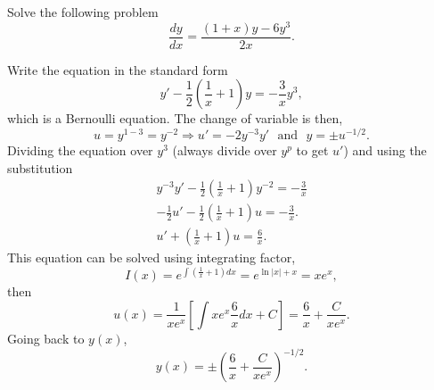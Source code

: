 \documentclass[11pt]{article}
\begin{document}
\begin{problem}
Solve the following problem
\begin{equation*}
     \frac{dy}{dx}=\frac{(1+x)y-6y^{3}}{2x}.
\end{equation*}
\end{problem}
\begin{solution}
Write the equation in the standard form
\[y'-\frac{1}{2}\left(\frac{1}{x}+1\right)y=-\frac{3}{x}y^{3},\]
which is a Bernoulli equation. The change of variable is then,
\[u = y^{1-3}=y^{-2}\Rightarrow u'=-2 y^{-3}y' \,\,\text{ and }\,\, y = \pm u^{-1/2}.\]
Dividing the equation over $y^{3}$ (always divide over $y^{p}$ to get $u'$) and using the substitution
\begin{gather*}
y^{-3}y'-\frac{1}{2}\left(\frac{1}{x}+1\right)y^{-2}=-\frac{3}{x} \\
-\frac{1}{2}u' - \frac{1}{2} \left(\frac{1}{x}+1\right)u=-\frac{3}{x}. \\
u' + \left(\frac{1}{x}+1\right)u=\frac{6}{x}.
\end{gather*}
This equation can be solved using integrating factor,
\[I(x)=e^{\int\left(\frac{1}{x}+1\right)dx}=e^{\ln|x|+x}=xe^{x},\]
then
\[u(x)= \frac{1}{x e^{x}}\left[\int xe^{x}\frac{6}{x}dx + C\right]= \frac{6}{x}+\frac{C}{xe^{x}}.\]
Going back to $y(x)$,
\[\boxed{y(x)= \pm\left(\frac{6}{x}+\frac{C}{xe^{x}}\right)^{-1/2}}.\]
\end{solution}



\end{document}
